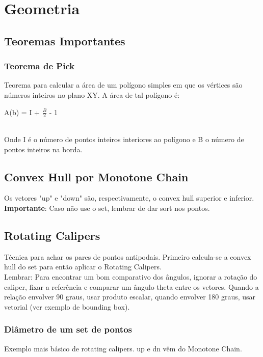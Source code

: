 \section{Geometria}

\subsection{Teoremas Importantes}

\subsubsection{Teorema de Pick}
Teorema para calcular a \'{a}rea de um pol\'{i}gono simples em que os v\'{e}rtices são n\'{u}meros inteiros no plano XY. A \'{a}rea de tal pol\'{i}gono é: 
\\\centerline{A(b) = I + $\frac{B}{2}$ - 1}
\\Onde I \'{e} o n\'{u}mero de pontos inteiros interiores ao pol\'{i}gono e B o n\'{u}mero de pontos inteiros na borda.
\divisor

\subsection{Convex Hull por Monotone Chain}
Os vetores "up" e "down" s\~{a}o, respectivamente, o convex hull superior e inferior.
\\ \textbf{Importante}: Caso n\~{a}o use o set, lembrar de dar sort nos pontos.

\divisor

\subsection{Rotating Calipers}

T\'{e}cnica para achar os pares de pontos antipodais. Primeiro calcula-se a convex hull do set para ent\~{a}o aplicar o Rotating Calipers.
\\ Lembrar: Para encontrar um bom comparativo dos \^{a}ngulos, ignorar a rota\c{c}\~{a}o do caliper, fixar a refer\^{e}ncia e comparar um \^{a}ngulo theta entre os vetores. Quando a rela\c{c}\~{a}o envolver 90 graus, usar produto escalar, quando envolver 180 graus, usar vetorial (ver exemplo de bounding box).

\subsubsection{Di\^{a}metro de um set de pontos}
Exemplo mais b\'{a}sico de rotating calipers. up e dn v\^{e}m do Monotone Chain.
\divisor

